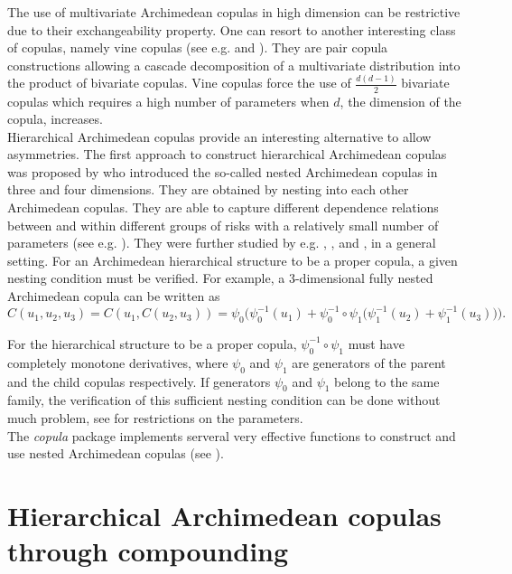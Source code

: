 \documentclass[11pt, english]{article}\usepackage[]{graphicx}\usepackage[]{color}
\begin{document}
The use of multivariate Archimedean copulas in high dimension can be
restrictive due to their exchangeability property. One can resort to
another interesting class of copulas, namely vine copulas (see e.g. \cite{bedford2002} and \cite{joe1997}). They are pair copula constructions
allowing a cascade decomposition of a multivariate distribution into the
product of bivariate copulas. Vine copulas force the use of $\frac{d(d-1)}{2%
}$ bivariate copulas which requires a high number of parameters when $d$,
the dimension of the copula, increases. \\


Hierarchical Archimedean copulas provide an interesting alternative to allow asymmetries.
The first approach to construct hierarchical Archimedean copulas was proposed by \cite{joe1997} who introduced the so-called nested Archimedean copulas in three and four dimensions. They
are obtained by nesting into each other Archimedean copulas.
They are able to capture different dependence relations between and within different
groups of risks with a relatively small number of parameters (see e.g. \cite{gorecki2016}). They were further studied by e.g. \cite{mcsample08}, \cite{hofert12eff}, and \cite{hofert11eff}, in a general setting.  For an Archimedean hierarchical structure to be a
proper copula, a given nesting condition must be verified. For example, a
3-dimensional fully nested Archimedean copula can be written as
\begin{equation*}
C(u_{1},u_{2},u_{3})=C(u_{1},C(u_{2},u_{3}))=\psi _{0}\Big(\psi
_{0}^{-1}(u_{1})+\psi _{0}^{-1}\circ \psi _{1}\big(\psi
_{1}^{-1}(u_{2})+\psi _{1}^{-1}(u_{3})\big)\Big).
\end{equation*}

For the hierarchical structure to be a proper copula, $\psi _{0}^{-1}\circ
\psi _{1}$ must have completely monotone derivatives, where $\psi _{0}$ and $%
\psi _{1}$ are generators of the parent and the child copulas respectively.
If generators $\psi _{0}$ and $\psi _{1}$ belong to the same family, the
verification of this sufficient nesting condition can be done without much
problem, see \cite{hofert} for restrictions on the parameters. \\

The \emph{copula} package implements serveral very effective functions to construct and use nested Archimedean copulas (see \cite{hofert2011nested}).

\section{Hierarchical Archimedean copulas through compounding}
\end{document}
